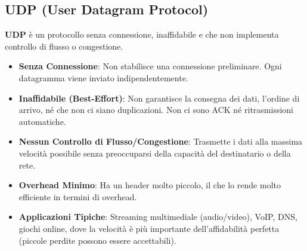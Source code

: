 \subsection{UDP (User Datagram Protocol)}
\textbf{UDP} è un protocollo senza connessione, inaffidabile e che non implementa controllo di flusso o congestione.
\begin{itemize}
    \item \textbf{Senza Connessione}: Non stabilisce una connessione preliminare. Ogni datagramma viene inviato indipendentemente.
    \item \textbf{Inaffidabile (Best-Effort)}: Non garantisce la consegna dei dati, l'ordine di arrivo, né che non ci siano duplicazioni. Non ci sono ACK né ritrasmissioni automatiche.
    \item \textbf{Nessun Controllo di Flusso/Congestione}: Trasmette i dati alla massima velocità possibile senza preoccuparsi della capacità del destinatario o della rete.
    \item \textbf{Overhead Minimo}: Ha un header molto piccolo, il che lo rende molto efficiente in termini di overhead.
    \item \textbf{Applicazioni Tipiche}: Streaming multimediale (audio/video), VoIP, DNS, giochi online, dove la velocità è più importante dell'affidabilità perfetta (piccole perdite possono essere accettabili).
\end{itemize}